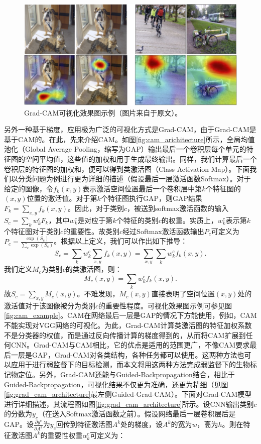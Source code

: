 \begin{figure}[h]
	\centering
	\includegraphics[width=1.0\textwidth]{figure/grad_cam_example}
	\caption{Grad-CAM可视化效果图示例（图片来自于原文）。} 
	\label{fig:grad_cam_example}
\end{figure}
另外一种基于梯度，应用极为广泛的可视化方式是Grad-CAM，由于Grad-CAM是基于CAM的。在此，先来介绍CAM。如图\ref{fig:cam_arichitecture}所示，全局均值池化（Global Average Pooling，缩写为GAP）输出最后一个卷积层每个单元的特征图的空间平均值，这些值的加权和用于生成最终输出。同样，我们计算最后一个卷积层的特征图的加权和，便可以得到类激活图（Class Activation Map）。下面我们以分类问题为例进行更为详细的描述（假设最后一层激活函数Softmax）。对于给定的图像，令$f_k(x, y)$表示激活空间位置最后一个卷积层中第$k$个特征图的$(x,y)$位置的激活值。对于第$k$个特征图执行GAP，则GAP结果$F_k=\sum_{x, y} f_{k}(x,y)$。因此，对于类别$c$，被送到softmax激活函数的输入$S_c=\sum_{k} w_{k}^{c} F_{k}$，其中$w_k^c$是对应于第$k$个特征的类别$c$的权重。实质上，$w_{k}^{c}$表示第$k$个特征图对于类别$c$的重要性。故类别$c$经过Softmax激活函数输出$P_c$可定义为$
P_c=\frac{\exp \left(S_{c}\right)}{\sum_{c} \exp \left(S_{c}\right)}$。根据以上定义，我们可以作出如下推导： 
\begin{equation*}
S_{c}=\sum_{k} w_{k}^{c} \sum_{x, y} f_{k}(x, y)=\sum_{x, y} \sum_{k} w_{k}^{c} f_{k}(x, y).
\end{equation*}
我们定义$M_c$为类别$c$的类激活图，则：
\begin{equation}\label{equ:cam_heatmap_compute}
M_{c}(x, y)=\sum_{k} w_{k}^{c} f_{k}(x, y).
\end{equation}
故$S_{c}=\sum_{x,y} M_{c}(x, y)$。不难发现，$M_{c}(x, y)$直接表明了空间位置$(x,y)$处的激活值对于该图像被分为类别$c$的重要性程度。可视化效果图示例可参见图\ref{fig:cam_example}。CAM在网络最后一层是GAP的情况下方能使用，例如，CAM不能实现对VGG网络的可视化。为此，Grad-CAM计算类激活图的特征加权系数不是分类器的权值，而是通过反向传播计算的梯度得到的，从而将CAM扩展到任何CNN。Grad-CAM与CAM相比，它的优点是适用的范围更广，不像CAM要求最后一层是GAP，Grad-CAM对各类结构，各种任务都可以使用。这两种方法也可以应用于进行弱监督下的目标检测，而本文将用这两种方法完成弱监督下的生物标记物定位。另外，Grad-CAM还能与Guided-Backpropagation结合，相比于Guided-Backpropagation，可视化结果不仅更为准确，还更为精细（见图\ref{fig:grad_cam_architecture}最左侧Guided-Grad-CAM）。下面对Grad-CAM模型进行详细描述，其流程图如图\ref{fig:grad_cam_architecture}所示。设CNN输出类别$c$的分数为$y_c$（在送入Softmax激活函数之前）。假设网络最后一层卷积层后是GAP。设$\frac{\partial y^{c}}{\partial A^{k}}$为$y_c$回传到特征激活图$A^{k}$处的梯度，设$A^{k}$的宽为$w$，高为$h$。则在特征激活图$A^{k}$的重要性权重$\alpha_{k}^{c}$可定义为：
